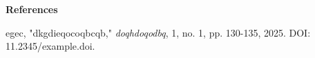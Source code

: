 \documentclass[12pt]{article}
\begin{document}
\noindent
\textbf{References}

\vspace{10pt}

\noindent
[6] egec, "dkgdieqocoqbcqb," \textit{doqhdoqodbq}, 1, no. 1, pp. 130-135, 2025. DOI: 11.2345/example.doi.
\end{document}
